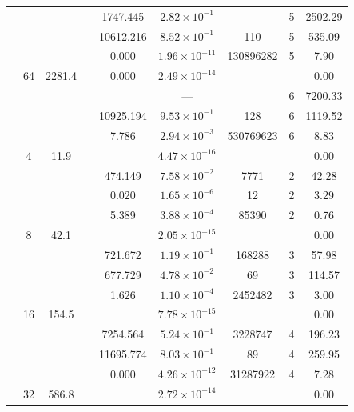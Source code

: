 \begin{table}[htbp]
\begin{tabular}{l S[table-format=3.0] S[table-format=4.1] l S[table-format=3.3] S[table-format=1.2e2] S[table-format=6.0] S[table-format=2.0] S[table-format=4.2]}
     &  &  &  & 1747.445 & $2.82 \times 10^{-1}$ & {\text{---}} & 5 & 2502.29 \\
     &  &  &  & 10612.216 & $8.52 \times 10^{-1}$ & 110 & 5 & 535.09 \\
     &  &  &  & 0.000 & $1.96 \times 10^{-11}$ & 130896282 & 5 & 7.90 \\
     & 64 & 2281.4 &  & 0.000 & $2.49 \times 10^{-14}$ & {\text{---}} & {\text{---}} & 0.00 \\
     &  &  &  & {\text{---}} & ${\text{---}}$ & {\text{---}} & 6 & 7200.33 \\
     &  &  &  & 10925.194 & $9.53 \times 10^{-1}$ & 128 & 6 & 1119.52 \\
     &  &  &  & 7.786 & $2.94 \times 10^{-3}$ & 530769623 & 6 & 8.83 \\
    \midrule
     & 4 & 11.9 &  & {\text{---}} & $4.47 \times 10^{-16}$ & {\text{---}} & {\text{---}} & 0.00 \\
     &  &  &  & 474.149 & $7.58 \times 10^{-2}$ & 7771 & 2 & 42.28 \\
     &  &  &  & 0.020 & $1.65 \times 10^{-6}$ & 12 & 2 & 3.29 \\
     &  &  &  & 5.389 & $3.88 \times 10^{-4}$ & 85390 & 2 & 0.76 \\
     & 8 & 42.1 &  & {\text{---}} & $2.05 \times 10^{-15}$ & {\text{---}} & {\text{---}} & 0.00 \\
     &  &  &  & 721.672 & $1.19 \times 10^{-1}$ & 168288 & 3 & 57.98 \\
     &  &  &  & 677.729 & $4.78 \times 10^{-2}$ & 69 & 3 & 114.57 \\
     &  &  &  & 1.626 & $1.10 \times 10^{-4}$ & 2452482 & 3 & 3.00 \\
     & 16 & 154.5 &  & {\text{---}} & $7.78 \times 10^{-15}$ & {\text{---}} & {\text{---}} & 0.00 \\
     &  &  &  & 7254.564 & $5.24 \times 10^{-1}$ & 3228747 & 4 & 196.23 \\
     &  &  &  & 11695.774 & $8.03 \times 10^{-1}$ & 89 & 4 & 259.95 \\
     &  &  &  & 0.000 & $4.26 \times 10^{-12}$ & 31287922 & 4 & 7.28 \\
     & 32 & 586.8 &  & {\text{---}} & $2.72 \times 10^{-14}$ & {\text{---}} & {\text{---}} & 0.00 \\

\end{tabular}
\end{table}
